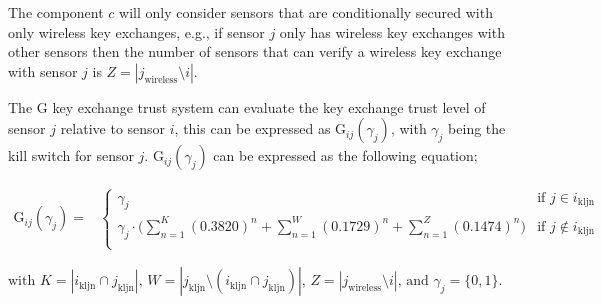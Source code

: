 \documentclass{ws-fnl2}
\begin{document}
The component $c$ will only consider sensors that are conditionally secured with only wireless key exchanges, e.g., if sensor $j$ only has wireless key exchanges with other sensors then the number of sensors that can verify a wireless key exchange with sensor $j$ is $Z=|j_{\mathrm{wireless}} \setminus i|$. 

The G key exchange trust system can evaluate the key exchange trust level of sensor $j$ relative to sensor $i$, this can be expressed as G$_{ij}(\gamma_j)$, with $\gamma_j$ being the kill switch for sensor $j$. $\mathrm{G}_{ij}(\gamma_j)$ can be expressed as the following equation;

\begin{equation*}
\begin{split}
\mathrm{G}_{ij}(\gamma_j) =&
 \begin{cases}
                                      \gamma_j & \text{if } j \in i_{\mathrm{kljn}} \\
                                      \gamma_j \cdot \big(\sum^K_{n=1}(0.3820)^n+\sum^W_{n=1}(0.1729)^n+\sum^Z_{n=1}(0.1474)^n\big) & \text{if }  j \notin i_{\mathrm{kljn}}\\ 
\end{cases}
\end{split}
\end{equation*}

\noindent
$\text{with } K = |i_{\mathrm{kljn}} \cap j_{\mathrm{kljn}}| \text{, } W=|j_{\mathrm{kljn}} \setminus (i_{\mathrm{kljn}} \cap j_{\mathrm{kljn}})| \text{, } Z=|j_{\mathrm{wireless}} \setminus i| \text{, and } \gamma_j=\{0,1\}$. 
\end{document}
